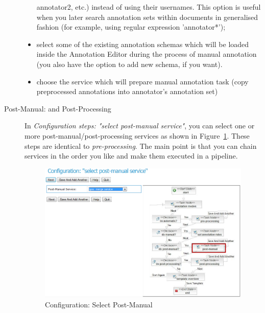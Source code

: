 \begin{description}
\begin{itemize}
       annotator2, etc.) instead of using their usernames. This option is
       useful when you later search annotation sets within documents in
       generalised fashion (for example, using regular expression 'annotator*');
       \item select some of the existing annotation schemas which will be
       loaded inside the Annotation Editor during the process of manual
       annotation (you also have the option to add new schema, if you want).
       \item choose the service which will prepare manual annotation task 
       (copy preprocessed annotations into annotator's annotation set)
   \end{itemize}
 \item  [Post-Manual: and Post-Processing] In \emph{Configuration steps:
   "select post-manual service"}, you can select one or more
   post-manual/post-processing services as shown in
   Figure~\ref{fig:selectpostmanual}. These steps are identical to
   \emph{pre-processing}. The main point is that you can chain services in the order you like 
   and make them executed in a pipeline.
\begin{figure}
\centering
\includegraphics[scale=0.38]{selectpostmanual}
\caption{Configuration: Select Post-Manual}
\label{fig:selectpostmanual}
\end{figure}
\end{description}


